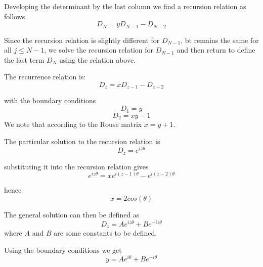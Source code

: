 \documentclass{paper}
\begin{document}
Developing the determinant by the last column we find a recursion relation as follows 
\begin{equation*}
D_N = yD_{N-1}-D_{N-2}
\end{equation*}

Since the recursion relation is slightly different for $D_{N-1}$, bt remains the same for all $j\leq N-1$, we solve the recursion relation for $D_{N-1}$ and then return to define the last term $D_N$ using the relation above. 

The recurrence relation is:
\begin{equation*}
D_z = xD_{z-1}-D_{z-2}
\end{equation*}

with the boundary conditions
\begin{equation*}
D_1 = y 
\end{equation*}
\begin{equation*}
D_2 = xy-1
\end{equation*}
We note that according to the Rouse matrix $x=y+1$.

The particular solution to the recursion relation is 
\begin{equation*}
D_z=e^{iz\theta}
\end{equation*}

substituting it into the recursion relation gives
\begin{equation*}
e^{iz\theta}=xe^{i(z-1)\theta}-e^{i(z-2)\theta}
\end{equation*}

hence
\begin{equation*}
x=2cos(\theta)
\end{equation*}

The general solution can then be defined as 
\begin{equation*}
D_z=Ae^{iz\theta}+Be^{-iz\theta}
\end{equation*}
where $A$ and $B$ are some constants to be defined.

 Using the boundary conditions we get 
 \begin{equation*}
 y = Ae^{i\theta}+Be^{-i\theta}
 \end{equation*}
 
\end{document}
